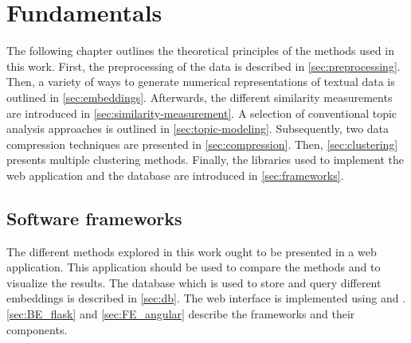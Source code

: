 \chapter{Fundamentals}\label{ch:methodology} %

The following chapter outlines the theoretical principles of the methods used in this work.
First, the preprocessing of the data is described in \autoref{sec:preprocessing}.
Then, a variety of ways to generate numerical representations of textual data is outlined in \autoref{sec:embeddings}.
Afterwards, the different similarity measurements are introduced in \autoref{sec:similarity-measurement}.
A selection of conventional topic analysis approaches is outlined in \autoref{sec:topic-modeling}.
Subsequently, two data compression techniques are presented in \autoref{sec:compression}.
Then, \autoref{sec:clustering} presents multiple clustering methods.
Finally, the libraries used to implement the web application and the database are introduced in \autoref{sec:frameworks}.




















\section{Software frameworks}\label{sec:frameworks}

The different methods explored in this work ought to be presented in a web application.
This application should be used to compare the methods and to visualize the results.
The database which is used to store and query different embeddings is described in \autoref{sec:db}.
The web interface is implemented using \flask{} and \angular{}.
\autoref{sec:BE_flask} and \autoref{sec:FE_angular} describe the frameworks and their components.





